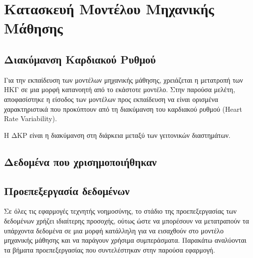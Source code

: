 
\section{Κατασκευή Μοντέλου Μηχανικής Μάθησης}{\label{machine_learning_model}}

\subsection{Διακύμανση Καρδιακού Ρυθμού}

Για την εκπαίδευση των μοντέλων μηχανικής μάθησης, χρειάζεται η μετατροπή των ΗΚΓ σε μια μορφή κατανοητή από το εκάστοτε μοντέλο. Στην παρούσα μελέτη, αποφασίστηκε η είσοδος των μοντέλων προς εκπαίδευση να είναι ορισμένα χαρακτηριστικά που προκύπτουν από τη διακύμανση του καρδιακού ρυθμού  (Heart Rate Variability).

Η ΔΚΡ είναι η διακύμανση στη διάρκεια μεταξύ των γειτονικών διαστημάτων.



\subsection{Δεδομένα που χρισημοποιήθηκαν}

\subsection{Προεπεξεργασία δεδομένων}

Σε όλες τις εφαρμογές τεχνητής νοημοσύνης, το στάδιο της προεπεξεργασίας των δεδομένων χρήζει ιδιαίτερης προσοχής, ούτως ώστε να μπορέσουν να μετατραπούν τα υπάρχοντα δεδομένα σε μια μορφή κατάλληλη για να εισαχθούν στο μοντέλο μηχανικής μάθησης και να παράγουν χρήσιμα συμπεράσματα. Παρακάτω αναλύονται τα βήματα προεπεξεργασίας που συντελέστηκαν στην παρούσα εφαρμογή.

